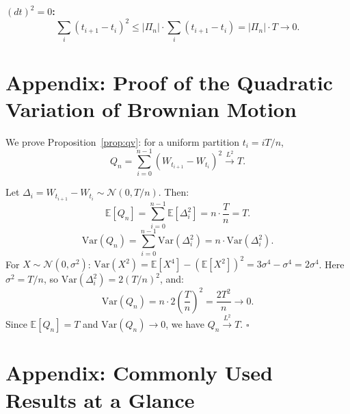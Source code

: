\documentclass[11pt,a4paper]{article}
\theoremstyle{definition}
\theoremstyle{plain}
\theoremstyle{remark}
\newcommand{\E}{\mathbb{E}}
\newcommand{\abs}[1]{\left|#1\right|}
\newcommand{\var}{\mathrm{Var}}
\begin{document}
\textbf{$(dt)^2 = 0$:}
\[
  \sum_i (t_{i+1}-t_i)^2 \leq \abs{\Pi_n}\cdot\sum_i(t_{i+1}-t_i) = \abs{\Pi_n}\cdot T \to 0.
\]

\section{Appendix: Proof of the Quadratic Variation of Brownian Motion}
\label{app:qv}

We prove Proposition~\ref{prop:qv}: for a uniform partition $t_i = iT/n$,
\[
  Q_n = \sum_{i=0}^{n-1}(W_{t_{i+1}}-W_{t_i})^2 \xrightarrow{L^2} T.
\]

Let $\Delta_i = W_{t_{i+1}} - W_{t_i} \sim \mathcal{N}(0, T/n)$. Then:
\[
  \E[Q_n] = \sum_{i=0}^{n-1}\E[\Delta_i^2] = n \cdot \frac{T}{n} = T.
\]
\[
  \var(Q_n) = \sum_{i=0}^{n-1}\var(\Delta_i^2) = n\cdot\var(\Delta_i^2).
\]
For $X \sim \mathcal{N}(0,\sigma^2)$: $\var(X^2) = \E[X^4] - (\E[X^2])^2 = 3\sigma^4 - \sigma^4 = 2\sigma^4$.
Here $\sigma^2 = T/n$, so $\var(\Delta_i^2) = 2(T/n)^2$, and:
\[
  \var(Q_n) = n\cdot 2\left(\frac{T}{n}\right)^2 = \frac{2T^2}{n} \to 0.
\]
Since $\E[Q_n] = T$ and $\var(Q_n) \to 0$, we have $Q_n \xrightarrow{L^2} T$. $\square$

\section{Appendix: Commonly Used Results at a Glance}
\label{app:ref}
\end{document}
